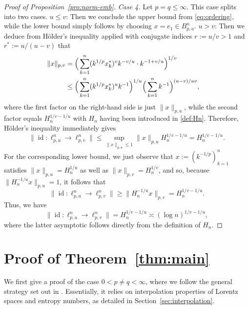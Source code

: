 \documentclass[a4paper,12pt]{article}
\theoremstyle{definition}
\DeclareMathOperator{\id}{id}
\begin{document}
\begin{proof}[Proof of Proposition~\ref{pro:norm-emb}]
\noindent\emph{Case 4.} Let $p=q\leq \infty$. This case splits into two cases. 
\vskip 1mm
$u\le v$: Then we conclude the upper bound from \eqref{eq:ordering}, while the lower bound simply follows by choosing $x=e_1\in B_{p,u}^n$.
\vskip 1mm
$u>v$:  Then we deduce from Hölder's inequality applied with conjugate indices $r:=u/v>1$ and $r^*:=u/(u-v)$ that
\begin{align*}
\|x\|_{p,v}
& = \Big(\sum_{k=1}^{n}(k^{1/p}x_k^*)^{v}k^{-v/u}\cdot k^{-1+v/u}\Big)^{1/v} \cr
& \le \Big(\sum_{k=1}^{n}(k^{1/p}x_k^*)^{u}k^{-1}\Big)^{1/u}\Big(\sum_{k=1}^{n}k^{-1}\Big)^{(u-v)/uv},
\end{align*}
where the first factor on the right-hand side is just $\|x\|_{p,u}$, while the second factor equals $H_n^{1/v-1/u}$ with $H_n$ having been  introduced in \eqref{def:Hn}.  Therefore, Hölder's inequality immediately gives
  \[
    \|\id\colon \ell_{p,u}^n\to \ell_{p,v}^n\| \leq \sup_{\|x\|_{p,u}\leq 1} \|x\|_{p,u} H_n^{1/v-1/u} = H_n^{1/v-1/u} .
  \]
For the corresponding lower bound, we just observe that $x:=(k^{-1/p})_{k=1}^n$ satisfies $\|x\|_{p,u}=H_n^{1/u}$ as well as $\|x\|_{p,v}=H_n^{1/v}$, and so, because $\|H_n^{-1/u}x\|_{p,u}=1$, it follows that
  \[
    \|\id\colon \ell_{p,u}^n\to \ell_{p,v}^n\| \geq  \|H_n^{-1/u}x\|_{p,v}  = H_n^{1/v-1/u}.
  \]
Thus, we have
   \[
    \|\id\colon \ell_{p,u}^n\to \ell_{p,v}^n\| = H_n^{1/v-1/u} \asymp (\log n)^{1/v-1/u},
  \]
where the latter asymptotic follows directly from the definition of $H_n$.  
\end{proof}



\section{Proof of Theorem~\ref{thm:main}}


We first give a proof of the case $0<p\neq q<\infty$, where we follow the general strategy set out in \cite[Section~4]{DV20}. Essentially, it relies on interpolation properties of Lorentz spaces and entropy numbers,
as detailed in Section~\ref{sec:interpolation}.   
\end{document}
